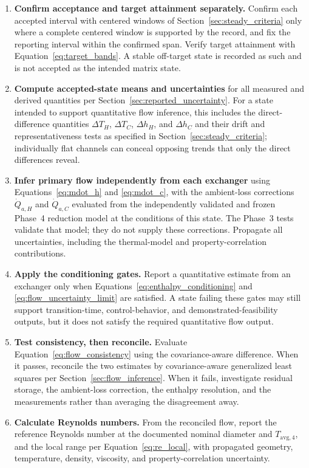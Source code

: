 \documentclass[11pt]{article}
\newcommand{\Tavg}{T_{\mathrm{avg},4}}
\begin{document}
\begin{enumerate}
    \item \textbf{Confirm acceptance and target attainment separately.} Confirm each accepted interval with centered windows of Section~\ref{sec:steady_criteria} only where a complete centered window is supported by the record, and fix the reporting interval within the confirmed span. Verify target attainment with Equation~\eqref{eq:target_bands}. A stable off-target state is recorded as such and is not accepted as the intended matrix state.

    \item \textbf{Compute accepted-state means and uncertainties} for all measured and derived quantities per Section~\ref{sec:reported_uncertainty}. For a state intended to support quantitative flow inference, this includes the direct-difference quantities $\Delta T_H$, $\Delta T_C$, $\Delta h_H$, and $\Delta h_C$ and their drift and representativeness tests as specified in Section~\ref{sec:steady_criteria}; individually flat channels can conceal opposing trends that only the direct differences reveal.

    \item \textbf{Infer primary flow independently from each exchanger} using Equations~\eqref{eq:mdot_h} and \eqref{eq:mdot_c}, with the ambient-loss corrections $\dot Q_{a,H}$ and $\dot Q_{a,C}$ evaluated from the independently validated and frozen Phase~4 reduction model at the conditions of this state. The Phase~3 tests validate that model; they do not supply these corrections. Propagate all uncertainties, including the thermal-model and property-correlation contributions.
%
    \item \textbf{Apply the conditioning gates.} Report a quantitative estimate from an exchanger only when Equations~\eqref{eq:enthalpy_conditioning} and \eqref{eq:flow_uncertainty_limit} are satisfied. A state failing these gates may still support transition-time, control-behavior, and demonstrated-feasibility outputs, but it does not satisfy the required quantitative flow output.

    \item \textbf{Test consistency, then reconcile.} Evaluate Equation~\eqref{eq:flow_consistency} using the covariance-aware difference. When it passes, reconcile the two estimates by covariance-aware generalized least squares per Section~\ref{sec:flow_inference}. When it fails, investigate residual storage, the ambient-loss correction, the enthalpy resolution, and the measurements rather than averaging the disagreement away.

    \item \textbf{Calculate Reynolds numbers.} From the reconciled flow, report the reference Reynolds number at the documented nominal diameter and $\Tavg$, and the local range per Equation~\eqref{eq:re_local}, with propagated geometry, temperature, density, viscosity, and property-correlation uncertainty.
\end{enumerate}
\end{document}
